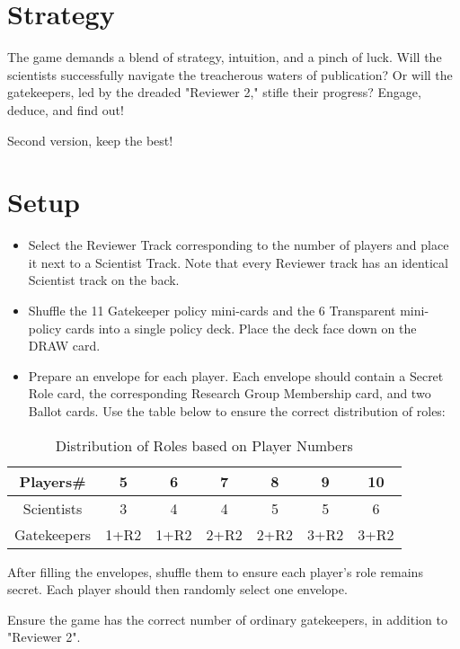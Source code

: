 \documentclass[sigplan,screen,nonacm]{acmart}
\begin{document}
\section*{Strategy}

The game demands a blend of strategy, intuition, and a pinch of luck. Will the scientists successfully navigate the treacherous waters of publication? Or will the gatekeepers, led by the dreaded "Reviewer 2," stifle their progress? Engage, deduce, and find out!

\clearpage

Second version, keep the best!

\section{Setup}

\begin{itemize}
	\item Select the Reviewer Track corresponding to the number of players and place it next to a Scientist Track. Note that every Reviewer track has an identical Scientist track on the back.
	\item Shuffle the 11 Gatekeeper policy mini-cards and the 6 Transparent mini-policy cards into a single policy deck. Place the deck face down on the DRAW card.
	\item Prepare an envelope for each player. Each envelope should contain a Secret Role card, the corresponding Research Group Membership card, and two Ballot cards. Use the table below to ensure the correct distribution of roles:
\end{itemize}

\begin{table}[h]
	\centering
	\begin{tabular}{|c|c|c|c|c|c|c|}
		\hline
		\textbf{Players\#} & 5 & 6 & 7 & 8 & 9 & 10 \\
		\hline
		Scientists & 3 & 4 & 4 & 5 & 5 & 6 \\
		\hline
		Gatekeepers & 1+R2 & 1+R2 & 2+R2 & 2+R2 & 3+R2 & 3+R2 \\
		\hline
	\end{tabular}
	\caption{Distribution of Roles based on Player Numbers}
	\label{tab:role_distribution}
\end{table}

After filling the envelopes, shuffle them to ensure each player's role remains secret. Each player should then randomly select one envelope.

Ensure the game has the correct number of ordinary gatekeepers, in addition to "Reviewer 2".
\end{document}
